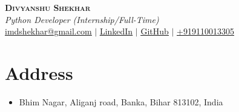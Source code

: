 \documentclass[letterpaper,11pt]{article}
\makeatletter
\newcommand{\resumeItem}[1]{
  \item\small{
    {#1 \vspace{-2pt}}
  }
}
\newcommand{\resumeSubheading}[4]{
  \vspace{-2pt}\item
    \begin{tabular*}{0.97\textwidth}[t]{l@{\extracolsep{\fill}}r}
      \textbf{#1} & #2 \\
      \textit{\small#3} & \textit{\small #4} \\
    \end{tabular*}\vspace{-7pt}
}
\newcommand{\resumeSubSubheading}[2]{
    \item
    \begin{tabular*}{0.97\textwidth}{l@{\extracolsep{\fill}}r}
      \textit{\small#1} & \textit{\small #2} \\
    \end{tabular*}\vspace{-7pt}
}
\newcommand{\resumeSubHeadingListStart}{\begin{itemize}[leftmargin=0.15in, label={}]}
\newcommand{\resumeSubHeadingListEnd}{\end{itemize}}
\newcommand{\resumeItemListStart}{\begin{itemize}}
\newcommand{\resumeItemListEnd}{\end{itemize}\vspace{-5pt}}
\newcommand{\role}[1]{\textit{\Large #1}}
\makeatother
\begin{document}

\begin{center}
    \textbf{\Huge \scshape Divyanshu Shekhar} \\ \vspace{2pt}
    \role{Python Developer (Internship/Full-Time)} \\ \vspace{2pt}
    \href{mailto:imdshekhar@gmail.com}{ \underline{imdshekhar@gmail.com}} $|$  
    \href{https://linkedin.com/in/dshekhar17}{ \underline{LinkedIn}} $|$
    \href{https://github.com/divshekhar}{ \underline{GitHub}} $|$
    \href{tel:+919110013305} { \underline{+919110013305}}
\end{center}

\section{Address}
\begin{itemize}[leftmargin=0.15in, label={}]
    \item \small Bhim Nagar, Aliganj road, Banka, Bihar 813102, India
\end{itemize}

        
\end{document}
